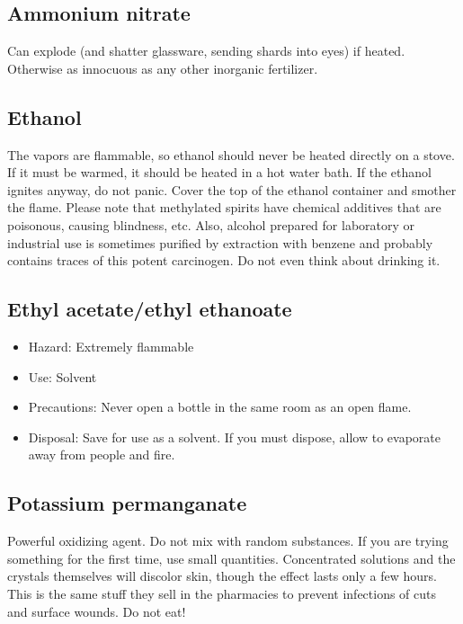\subsection{Ammonium nitrate}
Can explode (and shatter glassware, sending shards into eyes) if heated. 
Otherwise as innocuous as any other inorganic fertilizer.

\subsection{Ethanol} 
The vapors are flammable, 
so ethanol should never be heated directly on a stove. 
If it must be warmed, it should be heated in a hot water bath. 
If the ethanol ignites anyway, do not panic. 
Cover the top of the ethanol container and smother the flame. 
Please note that methylated spirits have chemical additives that are poisonous, 
causing blindness, etc. 
Also, alcohol prepared for laboratory or industrial use 
is sometimes purified by extraction with benzene 
and probably contains traces of this potent carcinogen. 
Do not even think about drinking it.

\subsection{Ethyl acetate/ethyl ethanoate}

\begin{itemize}

\item{Hazard: Extremely flammable}

\item{Use: Solvent}

\item{Precautions: Never open a bottle in the same room as an open flame.}

\item{Disposal: Save for use as a solvent. 
If you must dispose, allow to evaporate away from people and fire.}

\end{itemize}

\subsection{Potassium permanganate}
Powerful oxidizing agent. 
Do not mix with random substances. 
If you are trying something for the first time, use small quantities. 
Concentrated solutions and the crystals themselves will discolor skin, 
though the effect lasts only a few hours. 
This is the same stuff they sell in the pharmacies 
to prevent infections of cuts and surface wounds. 
Do not eat!

